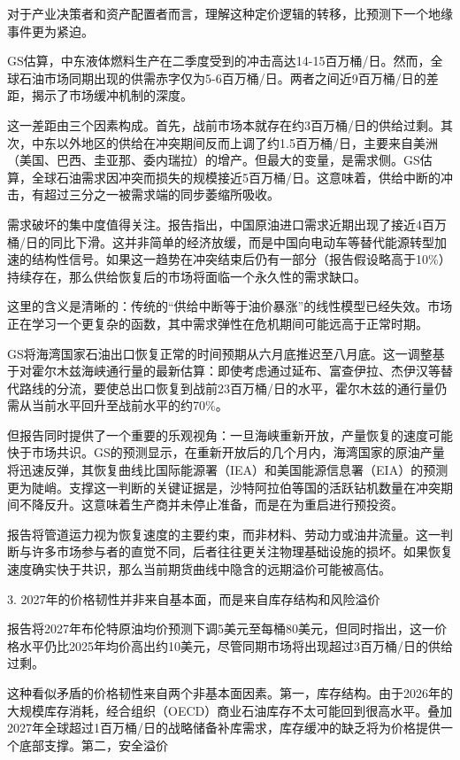 \documentclass[11pt]{ctexart}
\begin{document}
对于产业决策者和资产配置者而言，理解这种定价逻辑的转移，比预测下一个地缘事件更为紧迫。

GS估算，中东液体燃料生产在二季度受到的冲击高达14-15百万桶/日。然而，全球石油市场同期出现的供需赤字仅为5-6百万桶/日。两者之间近9百万桶/日的差距，揭示了市场缓冲机制的深度。

这一差距由三个因素构成。首先，战前市场本就存在约3百万桶/日的供给过剩。其次，中东以外地区的供给在冲突期间反而上调了约1.5百万桶/日，主要来自美洲（美国、巴西、圭亚那、委内瑞拉）的增产。但最大的变量，是需求侧。GS估算，全球石油需求因冲突而损失的规模接近5百万桶/日。这意味着，供给中断的冲击，有超过三分之一被需求端的同步萎缩所吸收。

需求破坏的集中度值得关注。报告指出，中国原油进口需求近期出现了接近4百万桶/日的同比下滑。这并非简单的经济放缓，而是中国向电动车等替代能源转型加速的结构性信号。如果这一趋势在冲突结束后仍有一部分（报告假设略高于10\%）持续存在，那么供给恢复后的市场将面临一个永久性的需求缺口。

这里的含义是清晰的：传统的“供给中断等于油价暴涨”的线性模型已经失效。市场正在学习一个更复杂的函数，其中需求弹性在危机期间可能远高于正常时期。

GS将海湾国家石油出口恢复正常的时间预期从六月底推迟至八月底。这一调整基于对霍尔木兹海峡通行量的最新估算：即使考虑通过延布、富查伊拉、杰伊汉等替代路线的分流，要使总出口恢复到战前23百万桶/日的水平，霍尔木兹的通行量仍需从当前水平回升至战前水平的约70\%。

但报告同时提供了一个重要的乐观视角：一旦海峡重新开放，产量恢复的速度可能快于市场共识。GS的预测显示，在重新开放后的几个月内，海湾国家的原油产量将迅速反弹，其恢复曲线比国际能源署（IEA）和美国能源信息署（EIA）的预测更为陡峭。支撑这一判断的关键证据是，沙特阿拉伯等国的活跃钻机数量在冲突期间不降反升。这意味着生产商并未停止准备，而是在为重启进行预投资。

报告将管道运力视为恢复速度的主要约束，而非材料、劳动力或油井流量。这一判断与许多市场参与者的直觉不同，后者往往更关注物理基础设施的损坏。如果恢复速度确实快于共识，那么当前期货曲线中隐含的远期溢价可能被高估。

3. 2027年的价格韧性并非来自基本面，而是来自库存结构和风险溢价

报告将2027年布伦特原油均价预测下调5美元至每桶80美元，但同时指出，这一价格水平仍比2025年均价高出约10美元，尽管同期市场将出现超过3百万桶/日的供给过剩。

这种看似矛盾的价格韧性来自两个非基本面因素。第一，库存结构。由于2026年的大规模库存消耗，经合组织（OECD）商业石油库存不太可能回到很高水平。叠加2027年全球超过1百万桶/日的战略储备补库需求，库存缓冲的缺乏将为价格提供一个底部支撑。第二，安全溢价
\end{document}
